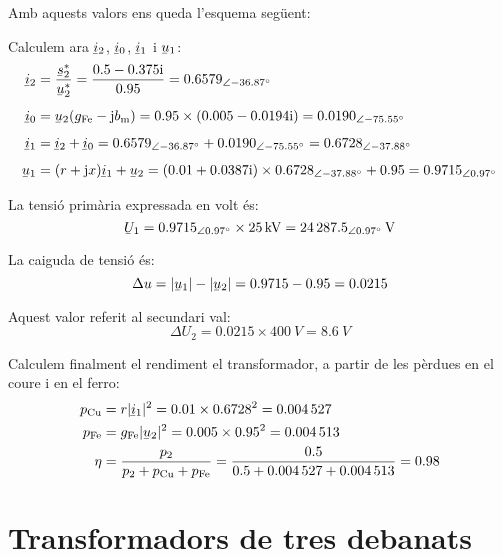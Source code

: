\begin{exemple}
    Amb aquests valors ens queda l'esquema següent:

    \begin{center}
        
    \end{center}

    Calculem ara $\cmplx{i}_2$, $\cmplx{i}_0$, $\cmplx{i}_1$ i $\cmplx{u}_1$:
    \begin{align*}
    \cmplx{i}_2 &= \frac{\cmplx{s}_2^*}{\cmplx{u}_2^*} = \frac{\complexnum{0,5 - j 0,375}}{\num{0,95}} = \numpd{0,6579}{-36,87} \\[1ex]
    \cmplx{i}_0 &= \cmplx{u}_2 (g\ped{Fe}-\ju b\ped{m}) = \num{0,95}\times(\complexnum{0,005-j0,0194}) = \numpd{0,0190}{-75,55} \\[1ex]
    \cmplx{i}_1 &= \cmplx{i}_2 + \cmplx{i}_0 =\numpd{0,6579}{-36,87} +\numpd{0,0190}{-75,55} = \numpd{0,6728}{-37,88} \\[1ex]
    \cmplx{u}_1 &=(r+\ju x) \cmplx{i}_1 + \cmplx{u}_2 = (\complexnum{0,01+j 0,0387}) \times \numpd{0,6728}{-37,88} + \num{0,95} =
    \numpd{0,9715}{0,97}
  \end{align*}

  La tensió primària expressada en volt és:
  \[
    \cmplx{U}_1 = \numpd{0,9715}{0,97}\times \qty{25}{kV} = \qtypd{24287,5}{0,97}{V}
  \]

   La caiguda de tensió és:
   \[
        \Delta u = |\cmplx{u}_1| - |\cmplx{u}_2| = \num{0,9715} - \num{0,95} = \num{0,0215}
   \]

   Aquest valor referit al secundari val:
   \[
        \Delta U_2 =\num{0,0215}\times \qty{400}{V} = \qty{8,6}{V}
   \]

   Calculem finalment el rendiment el transformador, a partir de les pèrdues en el coure  i en el ferro:
   \begin{align*}
    p\ped{Cu} &= r |\cmplx{i}_1|^2  = \num{0,01}\times \num{0,6728}^2 = \num{0,004527}\\
    p\ped{Fe} &= g\ped{Fe} |\cmplx{u}_2|^2 = \num{0,005}\times \num{0,95}^2 = \num{0,004513}\\
    \eta &= \frac{p_2}{p_2 + p\ped{Cu} + p\ped{Fe}} = \frac{\num{0,5}}{\num{0,5} + \num{0,004527} + \num{0,004513} } = \num{0,98}
  \end{align*}

\end{exemple}

\section{Transformadors de tres debanats}\label{sec:trafo-3-deban}

